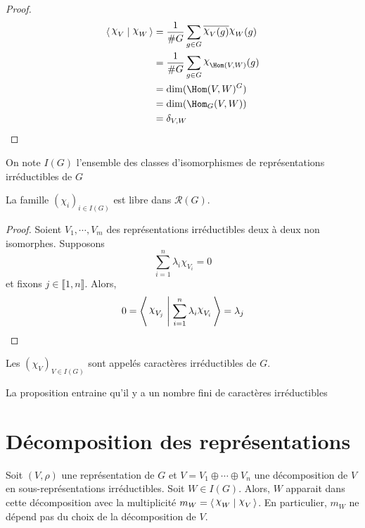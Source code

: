 \begin{proof}
    \begin{align*}
        \scalar{\chi_V}{\chi_W} &= \frac1{\#G}\sum_{g \in  G}\bar{\chi_V(g)}\chi_W(g) \\
                                &= \frac1{\#G}\sum_{g \in G} \chi_{\Hom(V, W)}(g)\\&=\dim(\Hom(V, W)^G) \\&=\dim(\Hom_G(V, W))\\&=\delta_{V,W}
    \end{align*}
\end{proof}

\begin{dfn}
    On note $I(G)$ l'ensemble des classes d'isomorphismes de représentations irréductibles de  $G$
\end{dfn}

\begin{prop}
    La famille $(\chi_i)_{i \in  I(G)}$ est libre dans $\mathcal  R(G)$.

\end{prop}

\begin{proof}
Soient $V_1, \cdots , V_m$ des représentations irréductibles deux à deux non isomorphes. Supposons \[
\sum_{i=1}^n\lambda_i\chi_{V_i}=0
\] 
et fixons $j \in  \llbracket 1,n \rrbracket $. Alors, \[
    0= \scalar{\chi_{V_j}}{\sum_{i=1}^n\lambda_i\chi_{V_i}}=\lambda_j 
\] 
\end{proof}

\begin{dfn}
    Les $(\chi_V)_{V \in  I(G)}$ sont appelés caractères irréductibles de $G$.
\end{dfn}

\begin{rem}
La proposition entraine qu'il y a un nombre fini de caractères irréductibles
\end{rem}

\section{Décomposition des représentations}

\begin{thm}
    Soit $(V, \rho)$ une représentation de  $G$ et  $V = V_1 \oplus \cdots  \oplus V_n$ une décomposition de $V$ en sous-représentations irréductibles. Soit  $W \in  I(G)$. Alors, $W$ apparait dans cette décomposition avec la multiplicité  $m_{W}= \scalar{\chi_W}{\chi_V} $. En particulier, $m_{W}$ ne dépend pas du choix de la décomposition de $V$.
\end{thm}

